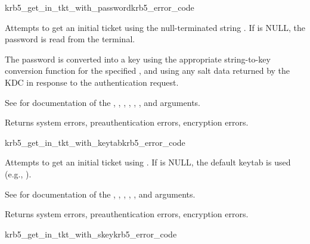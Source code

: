 \begin{funcdecl}{krb5_get_in_tkt_with_password}{krb5_error_code}{\funcin}
\funcinout
{}
\end{funcdecl}

Attempts to get an initial ticket using the null-terminated string
.  If  is NULL, the password
is read from the terminal.

The password is converted into a key using the appropriate
string-to-key conversion function for the specified
, and using any salt data returned by the KDC in
response to the authentication request.

See  for documentation of the
, , ,
, , ,
 and  arguments.

Returns system errors, preauthentication errors, encryption errors.

\begin{funcdecl}{krb5_get_in_tkt_with_keytab}{krb5_error_code}{\funcin}
\funcinout
{}
\end{funcdecl}

Attempts to get an initial ticket using .  If
 is NULL, the default keytab is used 
(e.g., ).

See  for documentation of the
, , ,
, ,  and
 arguments.

Returns system errors, preauthentication errors, encryption errors.

\begin{funcdecl}{krb5_get_in_tkt_with_skey}{krb5_error_code}{\funcin}
\funcinout
{}
\end{funcdecl}

